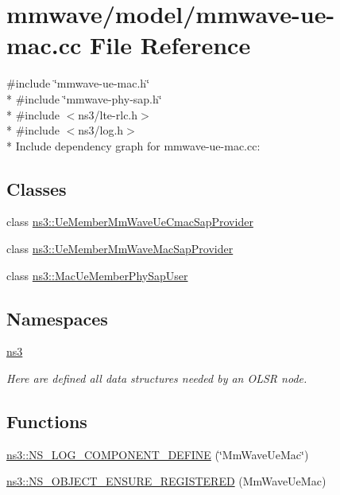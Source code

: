 \hypertarget{mmwave-ue-mac_8cc}{}\section{mmwave/model/mmwave-\/ue-\/mac.cc File Reference}
\label{mmwave-ue-mac_8cc}
{\ttfamily \#include \char`\"{}mmwave-\/ue-\/mac.\+h\char`\"{}}\\*
{\ttfamily \#include \char`\"{}mmwave-\/phy-\/sap.\+h\char`\"{}}\\*
{\ttfamily \#include $<$ns3/lte-\/rlc.\+h$>$}\\*
{\ttfamily \#include $<$ns3/log.\+h$>$}\\*
Include dependency graph for mmwave-\/ue-\/mac.cc\+:
\subsection*{Classes}
\begin{DoxyCompactItemize}
\item 
class \hyperlink{classns3_1_1UeMemberMmWaveUeCmacSapProvider}{ns3\+::\+Ue\+Member\+Mm\+Wave\+Ue\+Cmac\+Sap\+Provider}
\item 
class \hyperlink{classns3_1_1UeMemberMmWaveMacSapProvider}{ns3\+::\+Ue\+Member\+Mm\+Wave\+Mac\+Sap\+Provider}
\item 
class \hyperlink{classns3_1_1MacUeMemberPhySapUser}{ns3\+::\+Mac\+Ue\+Member\+Phy\+Sap\+User}
\end{DoxyCompactItemize}
\subsection*{Namespaces}
\begin{DoxyCompactItemize}
\item 
 \hyperlink{namespacens3}{ns3}
\begin{DoxyCompactList}\small\item\em Here are defined all data structures needed by an O\+L\+SR node. \end{DoxyCompactList}\end{DoxyCompactItemize}
\subsection*{Functions}
\begin{DoxyCompactItemize}
\item 
\hyperlink{namespacens3_aa6cf017294c06c10a19174ea8e7ab937}{ns3\+::\+N\+S\+\_\+\+L\+O\+G\+\_\+\+C\+O\+M\+P\+O\+N\+E\+N\+T\+\_\+\+D\+E\+F\+I\+NE} (\char`\"{}Mm\+Wave\+Ue\+Mac\char`\"{})
\item 
\hyperlink{namespacens3_a7e402678effdd543f248041337c9763d}{ns3\+::\+N\+S\+\_\+\+O\+B\+J\+E\+C\+T\+\_\+\+E\+N\+S\+U\+R\+E\+\_\+\+R\+E\+G\+I\+S\+T\+E\+R\+ED} (Mm\+Wave\+Ue\+Mac)
\end{DoxyCompactItemize}
